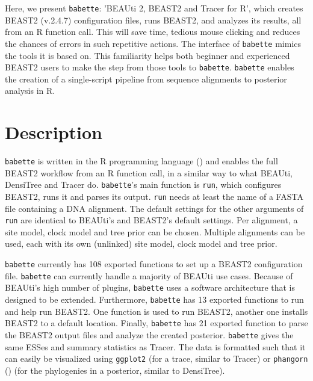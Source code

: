 \documentclass{article}
\begin{document}
Here, we present \verb;babette;:
’BEAUti 2, BEAST2 and Tracer for R’, 
which creates BEAST2 (v.2.4.7) configuration files,
runs BEAST2, and analyzes its results,
all from an R function call. This
will save time, tedious mouse clicking and 
reduces the chances of errors in such repetitive actions.
The interface of \verb;babette; mimics the tools it
is based on. This
familiarity helps both beginner and experienced BEAST2 users 
to make the step from those tools to \verb;babette;.
\verb;babette; enables the creation of a single-script 
pipeline from sequence alignments to posterior analysis in R. 

\section{Description}

\verb;babette; is written in the R programming language (\cite{R})
and enables the full BEAST2 workflow from an R function call,
in a similar way to what BEAUti, DensiTree and Tracer do.
\verb;babette;'s main function is \verb;run;, which
configures BEAST2, runs it and parses its output. 
\verb;run; needs at least the name of a 
FASTA file containing a DNA alignment. 
The default settings for the other arguments of \verb;run; 
are identical to BEAUti's and BEAST2's default settings.
Per alignment, a site model, clock model and tree prior can be chosen.
Multiple alignments can be used, each with its own (unlinked) site model, 
clock model and tree prior.

\verb;babette; currently has 108 exported functions to set up  
a BEAST2 configuration file. 
\verb;babette; can currently handle a majority of BEAUti use cases.
Because of BEAUti's high number of plugins, 
\verb;babette; uses a software architecture that is designed to be extended.
Furthermore, \verb;babette; has 13 exported functions to run and help run BEAST2.
One function is used to run BEAST2, another
one installs BEAST2 to a default location.
Finally, \verb;babette; has 21 exported function to parse the BEAST2 output
files and analyze the created posterior. \verb;babette; gives the
same ESSes and summary statistics as Tracer. The data is formatted
such that it can easily be visualized using \verb;ggplot2; (for a trace,
similar to Tracer) or \verb;phangorn; (\cite{phangorn}) (for 
the phylogenies in a posterior, similar to DensiTree). 
\end{document}
